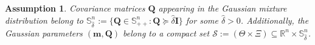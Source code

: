 \documentclass[opre,sglanonrev]{informs4}
\newtheorem{theorem}{Theorem}
\newtheorem{assumption}{Assumption}
\newcommand{\mS}{\mathcal{S}}
\newcommand{\mN}{\mathcal{N}}
\newcommand{\mX}{\mathcal{X}}
\newcommand{\mbR}{\mathbb R}
\newcommand{\mbS}{\mathbb S}
\newcommand{\bbeta}{\bm{\beta}}
\newcommand{\bmean}{\bm{m}}
\newcommand{\bc}{\bm{c}}
\newcommand{\bs}{\bm{s}}
\newcommand{\bx}{\bm{x}}
\newcommand{\bQ}{\bm Q}
\begin{document}
{\begin{assumption}\label{assmp: compactness}
Covariance matrices $\bQ$ appearing in the Gaussian mixture distribution belong to $\mbS^n_{\hat{\delta}} := \{\bQ \in \mbS^n_{++}: \bQ \succeq \hat{\delta} \bm{I}\}$ for some $\hat{\delta} >0$. Additionally, the Gaussian parameters $(\bmean,\bQ)$ belong to a compact set $\mS := (\Theta\times\Xi) \subseteq \mbR^n\times\mbS^n_{\hat\delta}$.
\end{assumption}


}
\end{document}
